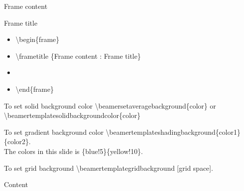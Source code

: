 \documentclass[9pt,blue,xcolor=pdftex,dvipsnames,table,handout,notes]{beamer}
\begin{document}
\begin{frame}[t,squeeze]{Frame content}

			\begin{block} {Frame title}
			\begin{itemize}
			\item[]	\textbackslash begin\{frame\}
			\item[]	\textbackslash frametitle \{Frame content : Frame title\}
			\item[]	
			\item[]	\textbackslash end\{frame\}
			\end{itemize}
			\end{block}





			\begin{block} {To set solid background color}
			\textbackslash beamersetaveragebackground\{color\} or\\
			\textbackslash beamertemplatesolidbackgroundcolor\{color\}
			\end{block}


			\begin{block} {To set gradient background color}
			\textbackslash beamertemplateshadingbackground\{color1\}\{color2\}.\\
			The colors in this slide is \{blue!5\}\{yellow!10\}.
			\end{block}


			\begin{block} {To set grid background}
			\textbackslash beamertemplategridbackground [grid space].
			\end{block}




			\begin{block} {Content}
			\end{block}

		\end{frame}
\end{document}
